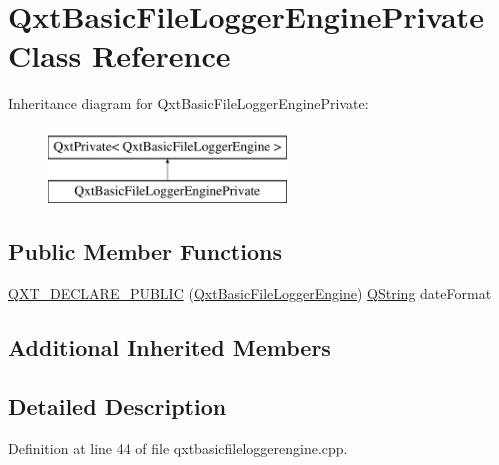 \hypertarget{class_qxt_basic_file_logger_engine_private}{\section{Qxt\-Basic\-File\-Logger\-Engine\-Private Class Reference}
\label{class_qxt_basic_file_logger_engine_private}
}
Inheritance diagram for Qxt\-Basic\-File\-Logger\-Engine\-Private\-:\begin{figure}[H]
\begin{center}
\leavevmode
\includegraphics[height=2.000000cm]{class_qxt_basic_file_logger_engine_private}
\end{center}
\end{figure}
\subsection*{Public Member Functions}
\begin{DoxyCompactItemize}
\item 
\hyperlink{class_qxt_basic_file_logger_engine_private_ae93f74712785638950515f50669aae35}{Q\-X\-T\-\_\-\-D\-E\-C\-L\-A\-R\-E\-\_\-\-P\-U\-B\-L\-I\-C} (\hyperlink{class_qxt_basic_file_logger_engine}{Qxt\-Basic\-File\-Logger\-Engine}) \hyperlink{group___u_a_v_objects_plugin_gab9d252f49c333c94a72f97ce3105a32d}{Q\-String} date\-Format
\end{DoxyCompactItemize}
\subsection*{Additional Inherited Members}


\subsection{Detailed Description}


Definition at line 44 of file qxtbasicfileloggerengine.\-cpp.



